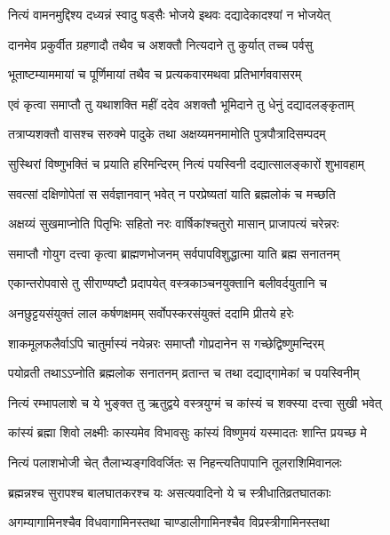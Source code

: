 \twolineshloka
{नित्यं वामनमुद्दिश्य दध्यन्नं स्वादु षड्सैः}
{भोजये इथवः दद्यादेकादश्यां न भोजयेत्} %

\twolineshloka
{दानमेव प्रकुर्वीत ग्रहणादौ तथैव च}
{अशक्तौ नित्यदाने तु कुर्यात् तच्च पर्वसु} %

\twolineshloka
{भूताष्टम्याममायां च पूर्णिमायां तथैव च}
{प्रत्यकवारमथवा प्रतिभार्गववासरम्} %

\twolineshloka
{एवं कृत्वा समाप्तौ तु यथाशक्ति महीं ददेव}
{अशक्तौ भूमिदाने तु धेनुं दद्यादलङ्कृताम्} %

\twolineshloka
{तत्राप्यशक्तौ वासश्च सरुक्मे पादुके तथा}
{अक्षय्यमनमामोति पुत्रपौत्रादिसम्पदम्} %

\twolineshloka
{सुस्थिरां विष्णुभक्तिं च प्रयाति हरिमन्दिरम्}
{नित्यं पयस्विनी दद्यात्सालङ्कारों शुभावहाम्} %

\twolineshloka
{सवत्सां दक्षिणोपेतां स सर्वज्ञानवान् भवेत्}
{न परप्रेष्यतां याति ब्रह्मलोकं च मच्छति} %

\twolineshloka
{अक्षय्यं सुखमाप्नोति पितृभिः सहितो नरः}
{वार्षिकांश्चतुरो मासान् प्राजापत्यं चरेन्नरः} %

\twolineshloka
{समाप्तौ गोयुग दत्त्वा कृत्वा ब्राह्मणभोजनम्}
{सर्वपापविशुद्धात्मा याति ब्रह्म सनातनम्} %

\twolineshloka
{एकान्तरोपवासे तु सीराण्यष्टौ प्रदापयेत्}
{वस्त्रकाञ्चनयुक्तानि बलीवर्दयुतानि च} %

\twolineshloka
{अनछुट्टयसंयुक्तं लाल कर्षणक्षमम्}
{सर्वोपस्करसंयुक्तं ददामि प्रीतये हरेः} %

\twolineshloka
{शाकमूलफलैर्वाऽपि चातुर्मास्यं नयेन्नरः}
{समाप्तौ गोप्रदानेन स गच्छेद्विष्णुमन्दिरम्} %

\twolineshloka
{पयोव्रती तथाऽऽप्नोति ब्रह्मलोक सनातनम्}
{व्रतान्त च तथा दद्याद्गामेकां च पयस्विनीम्} %

\twolineshloka
{नित्यं रम्भापलाशे च ये भुङ्क्त तु ऋतुद्वये}
{वस्त्रयुग्मं च कांस्यं च शक्स्या दत्त्वा सुखी भवेत्} %

\twolineshloka
{कांस्यं ब्रह्मा शिवो लक्ष्मीः कास्यमेव विभावसुः}
{कांस्यं विष्णुमयं यस्मादतः शान्ति प्रयच्छ मे} %

\twolineshloka
{नित्यं पलाशभोजी चेत् तैलाभ्यङ्गविवर्जितः}
{स निहन्त्यतिपापानि तूलराशिमिवानलः} %

\twolineshloka
{ब्रह्मन्नश्च सुरापश्च बालघातकरश्च यः}
{असत्यवादिनो ये च स्त्रीधातिव्रतघातकाः} %

\twolineshloka
{अगम्यागामिनश्चैव विधवागामिनस्तथा}
{चाण्डालीगामिनश्चैव विप्रस्त्रीगामिनस्तथा} %

